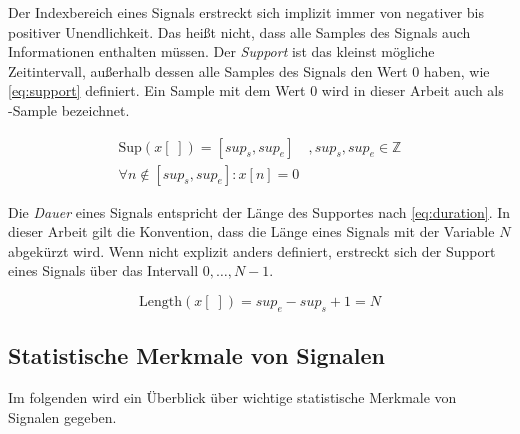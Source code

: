 Der Indexbereich eines Signals erstreckt sich implizit immer von negativer bis positiver Unendlichkeit. Das heißt nicht, dass alle Samples des Signals auch Informationen enthalten müssen. Der \emph{Support} ist das kleinst mögliche Zeitintervall, außerhalb dessen alle Samples des Signals den Wert 0 haben, wie \autoref{eq:support} definiert. Ein Sample mit dem Wert 0 wird in dieser Arbeit auch als -Sample\grqq{} bezeichnet.\cite[S. 24]{dspMichigan}

\begin{equation}
\label{eq:support}
\begin{split}
\text{Sup}(x[\;]) = [sup_s, sup_e] \quad , sup_s, sup_e \in \mathbb{Z} \\  \forall n \not\in [sup_s, sup_e] : x[n] = 0
\end{split}
\end{equation}

Die \emph{Dauer} eines Signals entspricht der Länge des Supportes nach \autoref{eq:duration}. In dieser Arbeit gilt die Konvention, dass die Länge eines Signals mit der Variable $N$ abgekürzt wird. Wenn nicht explizit anders definiert, erstreckt sich der Support eines Signals über das Intervall $0 ,\ldots, N-1$.\cite[S. 24]{dspMichigan}

\begin{equation}
\text{Length}(x[\;]) = sup_e - sup_s + 1 = N
\label{eq:duration}
\end{equation}


\subsection{Statistische Merkmale von Signalen}

Im folgenden wird ein Überblick über wichtige statistische Merkmale von Signalen gegeben.


